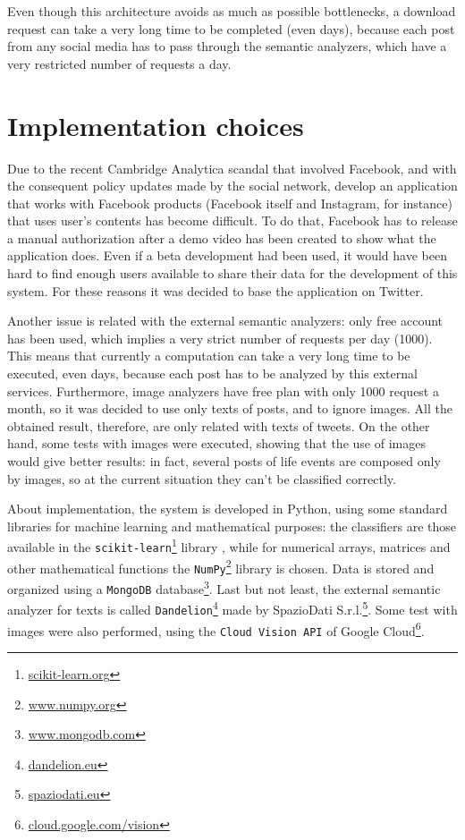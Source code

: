 Even though this architecture avoids as much as possible bottlenecks, a download request can take a very long time to be completed (even days), because each post from any social media has to pass through the semantic analyzers, which have a very restricted number of requests a day.

\section{Implementation choices}
\label{sec:choices}
Due to the recent Cambridge Analytica scandal that involved Facebook, and with the consequent policy updates made by the social network, develop an application that works with Facebook products (Facebook itself and Instagram, for instance) that uses user's contents has become difficult. To do that, Facebook has to release a manual authorization after a demo video has been created to show what the application does. Even if a beta development had been used, it would have been hard to find enough users available to share their data for the development of this system. For these reasons it was decided to base the application on Twitter.

Another issue is related with the external semantic analyzers: only free account has been used, which implies a very strict number of requests per day (1000). This means that currently a computation can take a very long time to be executed, even days, because each post has to be analyzed by this external services. Furthermore, image analyzers have free plan with only 1000 request a month, so it was decided to use only texts of posts, and to ignore images. All the obtained result, therefore, are only related with texts of tweets. On the other hand, some tests with images were executed, showing that the use of images would give better results: in fact, several posts of life events are composed only by images, so at the current situation they can't be classified correctly.

About implementation, the system is developed in Python, using some standard libraries for machine learning and mathematical purposes: the classifiers  
are those available in the \texttt{scikit-learn}\footnote{\url{scikit-learn.org}} library \cite{scikit-learn}, while for numerical arrays, matrices and other mathematical functions the \texttt{NumPy}\footnote{\url{www.numpy.org}} library \cite{oliphant2006guide} is chosen. Data is stored and organized using a \texttt{MongoDB} database\footnote{\url{www.mongodb.com}}. Last but not least, the external semantic analyzer for texts is called \texttt{Dandelion}\footnote{\url{dandelion.eu}} made by SpazioDati S.r.l.\footnote{\url{spaziodati.eu}}. Some test with images were also performed, using the \texttt{Cloud Vision API} of Google Cloud\footnote{\url{cloud.google.com/vision}}.

